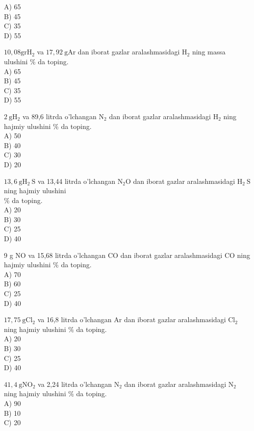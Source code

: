 A) 65\\
B) 45\\
C) 35\\
D) 55
  \item $10,08 \mathrm{gr} \mathrm{H}_{2}$ va $17,92 \mathrm{~g} \mathrm{Ar}$ dan iborat gazlar aralashmasidagi $\mathrm{H}_{2}$ ning massa ulushini \% da toping.\\
A) 65\\
B) 45\\
C) 35\\
D) 55
  \item $2 \mathrm{~g} \mathrm{H}_{2}$ va 89,6 litrda o'lchangan $\mathrm{N}_{2}$ dan iborat gazlar aralashmasidagi $\mathrm{H}_{2}$ ning hajmiy ulushini \% da toping.\\
A) 50\\
B) 40\\
C) 30\\
D) 20\\
  \item $13,6 \mathrm{~g} \mathrm{H}_{2} \mathrm{~S}$ va 13,44 litrda o'lchangan $\mathrm{N}_{2} \mathrm{O}$ dan iborat gazlar aralashmasidagi $\mathrm{H}_{2} \mathrm{~S}$ ning hajmiy ulushini\\
$\%$ da toping.\\
A) 20\\
B) 30\\
C) 25\\
D) 40
  \item 9 g NO va 15,68 litrda o'lchangan CO dan iborat gazlar aralashmasidagi CO ning hajmiy ulushini \% da toping.\\
A) 70\\
B) 60\\
C) 25\\
D) 40
  \item $17,75 \mathrm{~g} \mathrm{Cl}_{2}$ va 16,8 litrda o'lchangan Ar dan iborat gazlar aralashmasidagi $\mathrm{Cl}_{2}$ ning hajmiy ulushini $\%$ da toping.\\
A) 20\\
B) 30\\
C) 25\\
D) 40
  \item $41,4 \mathrm{~g} \mathrm{NO}_{2}$ va 2,24 litrda o'lchangan $\mathrm{N}_{2}$ dan iborat gazlar aralashmasidagi $\mathrm{N}_{2}$ ning hajmiy ulushini $\%$ da toping.\\
A) 90\\
B) 10\\
C) 20\\
